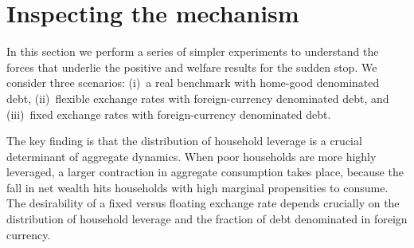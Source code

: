 \documentclass[\latexroot/\projectname]{subfiles}
\begin{document}
\section{Inspecting the mechanism}
\whenintegrated{\label{sec:mechanism}}

In this section we perform a series of simpler experiments to understand the forces that underlie the positive and welfare results for the sudden stop. We consider three scenarios: (i)~a real benchmark with home-good denominated debt, (ii)~flexible exchange rates with foreign-currency denominated debt, and (iii)~fixed exchange rates with foreign-currency denominated debt.

The key finding is that the distribution of household leverage is a crucial determinant of aggregate dynamics. When poor households are more highly leveraged, a larger contraction in aggregate consumption takes place, because the fall in net wealth hits households with high marginal propensities to consume. The desirability of a fixed versus floating exchange rate depends crucially on the distribution of household leverage and the fraction of debt denominated in foreign currency.

\smartbib
\end{document}
